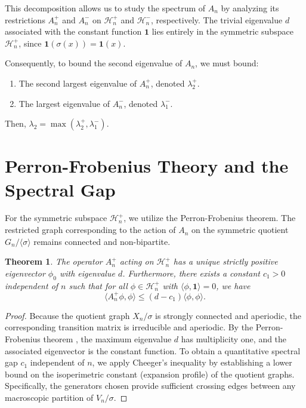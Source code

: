 \documentclass[11pt, a4paper]{article}
\newtheorem{theorem}{Theorem}[section]
\theoremstyle{definition}
\begin{document}
This decomposition allows us to study the spectrum of $A_n$ by analyzing its restrictions $A_n^+$ and $A_n^-$ on $\mathcal{H}_n^+$ and $\mathcal{H}_n^-$, respectively. The trivial eigenvalue $d$ associated with the constant function $\mathbf{1}$ lies entirely in the symmetric subspace $\mathcal{H}_n^+$, since $\mathbf{1}(\sigma(x)) = \mathbf{1}(x)$.

Consequently, to bound the second eigenvalue of $A_n$, we must bound:
\begin{enumerate}
    \item The second largest eigenvalue of $A_n^+$, denoted $\lambda_2^+$.
    \item The largest eigenvalue of $A_n^-$, denoted $\lambda_1^-$.
\end{enumerate}

Then, $\lambda_2 = \max(\lambda_2^+, \lambda_1^-)$.

\section{Perron-Frobenius Theory and the Spectral Gap}

For the symmetric subspace $\mathcal{H}_n^+$, we utilize the Perron-Frobenius theorem. The restricted graph corresponding to the action of $A_n$ on the symmetric quotient $G_n/\langle \sigma \rangle$ remains connected and non-bipartite.

\begin{theorem} \label{thm:pf_symmetric}
The operator $A_n^+$ acting on $\mathcal{H}_n^+$ has a unique strictly positive eigenvector $\phi_0$ with eigenvalue $d$. Furthermore, there exists a constant $c_1 > 0$ independent of $n$ such that for all $\phi \in \mathcal{H}_n^+$ with $\langle \phi, \mathbf{1} \rangle = 0$, we have
\begin{equation}
    \langle A_n^+ \phi, \phi \rangle \le (d - c_1) \langle \phi, \phi \rangle.
\end{equation}
\end{theorem}

\begin{proof}
Because the quotient graph $X_n / \sigma$ is strongly connected and aperiodic, the corresponding transition matrix is irreducible and aperiodic. By the Perron-Frobenius theorem \cite{godsil2001algebraic}, the maximum eigenvalue $d$ has multiplicity one, and the associated eigenvector is the constant function. 
To obtain a quantitative spectral gap $c_1$ independent of $n$, we apply Cheeger's inequality by establishing a lower bound on the isoperimetric constant (expansion profile) of the quotient graphs. Specifically, the generators chosen provide sufficient crossing edges between any macroscopic partition of $V_n / \sigma$. 
\end{proof}
\end{document}
